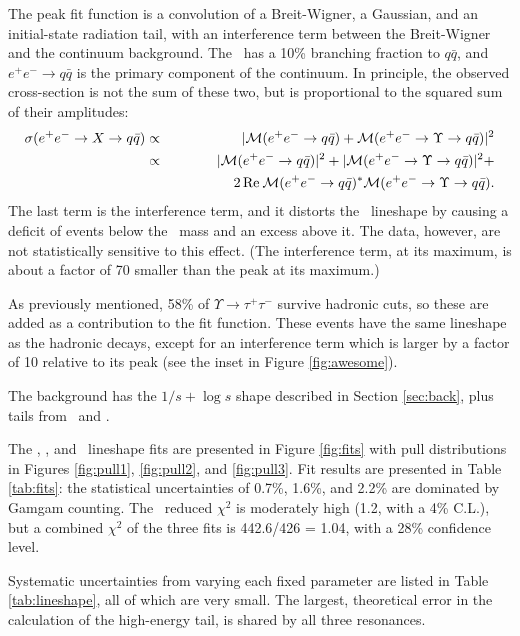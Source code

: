 \documentclass[aps,prd,preprint,superscriptaddress,tightenlines,nofootinbib,floatfix]{revtex4}
\begin{document}
The peak fit function is a convolution of a Breit-Wigner, a Gaussian,
and an initial-state radiation tail, with an interference term between
the Breit-Wigner and the continuum background.  The \ups\ has a 10\%
branching fraction to $q\bar{q}$, and $e^+e^- \to q\bar{q}$ is the
primary component of the continuum.  In principle, the observed
cross-section is not the sum of these two, but is proportional to the
squared sum of their amplitudes:
\begin{eqnarray}
  \sigma(e^+e^- \to X \to q\bar{q}) &\propto& |\mathcal{M}(e^+e^- \to q\bar{q}) + \mathcal{M}(e^+e^- \to \Upsilon \to q\bar{q})|^2 \\
  &\propto& |\mathcal{M}(e^+e^- \to q\bar{q})|^2 + |\mathcal{M}(e^+e^- \to \Upsilon \to q\bar{q})|^2 + \nonumber \\
  & & \mbox{\hspace{1.5 cm}} 2 \, \mathrm{Re\:} \mathcal{M}(e^+e^- \to q\bar{q})^* \mathcal{M}(e^+e^- \to \Upsilon \to q\bar{q}) \mbox{.}
\end{eqnarray}
The last term is the interference term, and it distorts the \ups\
lineshape by causing a deficit of events below the \ups\ mass and an
excess above it.  The data, however, are not statistically sensitive
to this effect.  (The interference term, at its maximum, is about a
factor of 70 smaller than the peak at its maximum.)

As previously mentioned, 58\% of $\Upsilon \to \tau^+\tau^-$ survive
hadronic cuts, so these are added as a contribution to the fit
function.  These events have the same lineshape as the hadronic
decays, except for an interference term which is larger by a factor of
10 relative to its peak (see the inset in Figure \ref{fig:awesome}).

The background has the $1/s + \log s$ shape described in Section
\ref{sec:back}, plus tails from \uone\ and \utwo.

The \uone, \utwo, and \uthree\ lineshape fits are presented in Figure
\ref{fig:fits} with pull distributions in Figures \ref{fig:pull1},
\ref{fig:pull2}, and \ref{fig:pull3}.  Fit results are presented in
Table \ref{tab:fits}: the statistical uncertainties of 0.7\%, 1.6\%,
and 2.2\% are dominated by Gamgam counting.  The \uone\ reduced
$\chi^2$ is moderately high (1.2, with a 4\% C.L.), but a combined
$\chi^2$ of the three fits is 442.6/426 = 1.04, with a 28\% confidence
level.

Systematic uncertainties from varying each fixed parameter are listed
in Table \ref{tab:lineshape}, all of which are very small.  The
largest, theoretical error in the calculation of the high-energy tail,
is shared by all three resonances.
\end{document}
